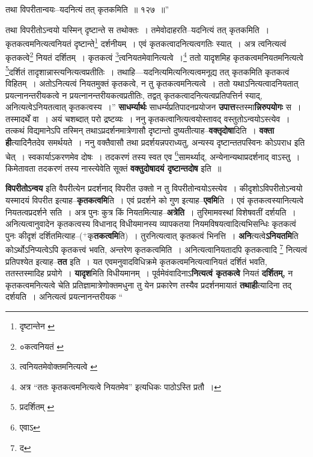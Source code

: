 \documentclass[article,12pt,a4paper]{memoir}
\newcommand{\add}[1]{($^{+}$#1)}
\begin{document}
	तथा विपरीतान्वयः--यदनित्यं तत् कृतकमिति ॥ १२७ ॥” 
	  
	तथा विपरीतोऽन्वयो यस्मिन् दृष्टान्ते स तथोक्तः । तमेवोदाहरति--यदनित्यं तत् कृतकमिति । कृतकत्वमनित्यत्वनियतं दृष्टान्ते\footnote{दृष्टान्तेन \cite{dp-edE}} दर्शनीयम् । एवं कृतकत्वादनित्यत्वगतिः स्यात् । अत्र त्वनित्यत्वं कृतकत्वे\footnote{०कत्वनियतं \cite{dp-msD}} नियतं दर्शितम् । कृतकत्वं \footnote{त्वनियतमेवोक्तमनित्यत्वे \cite{dp-msC} \cite{dp-msD}}त्वनियतमेवानित्यत्वे ।\footnote{अत्र “ततः कृतकत्वमनित्यत्वे नियतमेव” इत्यधिकः पाठोऽस्ति \cite{dp-edE} प्रतौ ।} ततो यादृशमिह कृतकत्वमनियतमनित्यत्वे \footnote{प्रदर्शितम् \cite{dp-msA} \cite{dp-msB} \cite{dp-edP} \cite{dp-edH} \cite{dp-edE} \cite{dp-edN}}दर्शितं तादृशान्नास्त्यनित्यत्वप्रतीतिः । तथाहि—यदनित्यमित्यनित्यत्वमनूद्य तत् कृतकमिति कृतकत्वं विहितम् । अतोऽनित्यत्वं नियतमुक्तं कृतकत्वे, न तु कृतकत्वमनित्यत्वे । ततो यथाऽनित्यत्वादनियतात् प्रयत्नानन्तरीयकत्वे न प्रयत्नानन्तरीयकत्वप्रतीतिः, तद्वत् कृतकत्वादनित्यत्वप्रतिपत्तिर्न स्याद्, अनित्यत्वेऽनियतत्वात् कृतकत्वस्य ।” \textbf{साधर्म्यार्थः} साधर्म्यप्रतिपादनप्रयोजन \textbf{उपात्त}स्तस्मा\textbf{न्निरुपयोगः} स । तस्मादर्थें वा । अयं चशब्दात् परो द्रष्टव्यः । ननु कृतकत्वानित्यत्वयोस्तावद् वस्तुतोऽन्वयोऽस्त्येव । तत्कथं विद्यमानेऽपि तस्मिन् तथाऽप्रदर्शनमात्रेणासौ दृष्टान्तो दुष्यतीत्याह--\textbf{वक्तृदोषा}दिति । \textbf{वक्ता ही}त्यादिनैतदेव समर्थयते । ननु वक्तैवासौ तथा प्रदर्शयन्नपराध्यतु, अन्यस्य दृष्टान्ततपस्विनः कोऽपराध इति चेत् । स्वकार्याऽकरणमेव दोषः । तदकरणं तस्य स्वत एव \footnote{एवाऽ}सामर्थ्याद्, अन्येनान्यथाप्रदर्शनाद् वाऽस्तु । किमेतावता तदकरणं तस्य नास्त्येवेति सूक्तं \textbf{वक्तुदोषादयं दृष्टान्तदोष} इति ॥
	\pend
      

	  \pstart \textbf{विपरीतोऽन्वय} इति वैपरीत्येन प्रदर्शनाद् विपरीत उक्तो न तु विपरीतोन्वयोऽस्त्येव । कीदृशोऽविपरीतोऽन्वयो यस्मादयं विपरीत इत्याह--\textbf{कृतकत्वमि}ति । एवं प्रदर्शने को गुण इत्याह--\textbf{एवमि}ति । एवं कृतकत्वस्यानित्यत्वे नियतत्वप्रदर्शने सति । अत्र पुनः कुत्र किं नियतमित्याह--\textbf{अत्रेति} । तुरिमामवस्थां विशेषवतीं दर्शयति । अनित्यत्वानुवादेन कृतकत्वस्य विधानाद् विधीयमानस्य व्यापकतया नियमविषयत्वादित्यभिसन्धिः कृतकत्वं पुनः कीदृशं दर्शितमित्याह--\add{कृ\textbf{तकत्वमि}ति} । तुरनित्यत्वात् कृतकत्वं भिनत्ति । \textbf{अनि}त्यत्वे\textbf{ऽनियतमि}ति कोऽर्थोऽनिप्यत्वेऽपि कृतकत्त्वं भवति, अन्तरेण कृतकत्वमिति । अनित्यत्वानियतादपि कृतकत्वादि \footnote{द} नित्यत्वं प्रतिपश्येत इत्याह--\textbf{तत} इति । यत एवमनुवादविधिक्रमे कृतकत्वमनित्यत्वानियतं दर्शितं भवति, ततस्तस्मादिह प्रयोगे । \textbf{यादृश}मिति विधीयमानम् । पूर्वमेवंवादिनाऽ\textbf{नित्यत्वं कृतकत्वे} नियतं \textbf{दर्शितम्,} न कृतकत्वमनित्यत्वे चेति प्रतिज्ञामात्रेणोक्तमधुना तु येन प्रकारेण तस्यैव प्रदर्शनमायातं \textbf{तथाही}त्यादिना तद् दर्शयति । अनित्यत्वं प्रयत्नानन्तरीयक  \leavevmode{} “
	  
\end{document}
